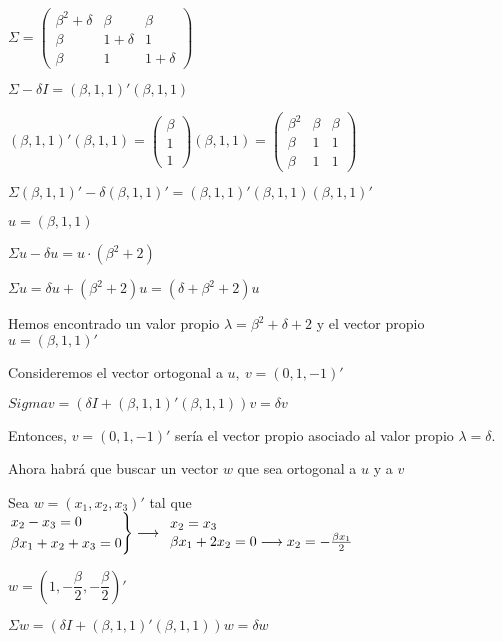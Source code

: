 \begin{enumerate}[label=\color{red}\textbf{\arabic*)}, leftmargin=*]
	$
	\Sigma=\begin{pmatrix}
		\beta^{2}+\delta  & \beta & \beta \\
		\beta & 1+\delta & 1 \\
		\beta & 1 & 1+\delta
	\end{pmatrix}
	$
	
	$\Sigma-\delta I=(\beta,1,1)'(\beta,1,1)$
	
	$(\beta,1,1)'(\beta,1,1)=\begin{pmatrix}\beta\\1\\1\end{pmatrix}(\beta,1,1)=\begin{pmatrix}
		\beta^{2} & \beta & \beta \\ 
		\beta & 1 & 1 \\
		\beta & 1 & 1
	\end{pmatrix}$
	
	$\Sigma(\beta,1,1)'-\delta(\beta,1,1)'=(\beta,1,1)'(\beta,1,1)(\beta,1,1)'$
	
	$u=(\beta,1,1)$
	
	$\Sigma u -\delta u=u\cdot(\beta^{2}+2)$
	
	$\Sigma u=\delta u+(\beta ^{2}+2)u=(\delta+\beta^{2}+2)u$
	
	Hemos encontrado un valor propio $\lambda=\beta^{2}+\delta+2$ y el vector propio $u=(\beta,1,1)'$
	
	Consideremos el vector ortogonal a $u,\:v=(0,1,-1)'$
	
	$Sigma v=(\delta I+(\beta,1,1)'(\beta,1,1))v=\delta v$
	
	Entonces, $v=(0,1,-1)'$ sería el vector propio asociado al valor propio $\lambda=\delta$.
	
	Ahora habrá que buscar un vector $w$ que sea ortogonal a $u$ y a $v$
	
	Sea $w=(x_1,x_2,x_3)'$ tal que $\begin{rcases}
		x_2-x_3=0\\
		\beta x_1+x_2+x_3=0
	\end{rcases}\longrightarrow\begin{array}{l}
	x_2=x_3\\
	\beta x_1+2x_2=0\longrightarrow x_2=-\frac{\beta x_1}{2}
	\end{array}$
	
	$w=\left(1,-\dfrac{\beta}{2},-\dfrac{\beta}{2}\right)'$
	
	$\Sigma w=\left(\delta I+(\beta,1,1)'(\beta,1,1)\right)w=\delta w$
	

\end{enumerate}
